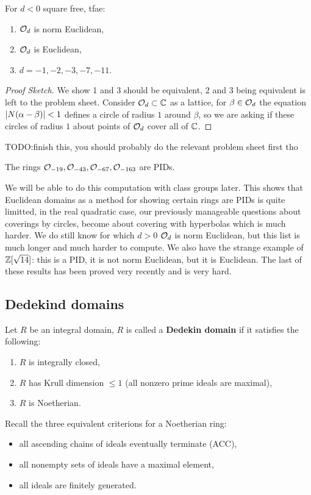\documentclass{article}
\begin{document}
\begin{theorem}
    For $d<0$ square free, tfae: \begin{enumerate}
        \item $\mathcal{O}_d$ is norm Euclidean,
        \item $\mathcal{O}_d$ is Euclidean,
        \item $d=-1,-2,-3,-7,-11$.
    \end{enumerate}
    \begin{proof}[Proof Sketch]
        We show 1 and 3 should be equivalent, 2 and 3 being equivalent is left to the problem sheet. Consider $\mathcal{O}_{d}\subset \mathbb{C}$ as a lattice, for $\beta\in\mathcal{O}_d$ the equation $\left| N(\alpha-\beta) \right|<1$ defines a circle of radius $1$ around $\beta$, so we are asking if these circles of radius $1$ about points of $\mathcal{O}_d$ cover all of $\mathbb{C}$. 
    \end{proof}
\end{theorem}

TODO:finish this, you should probably do the relevant problem sheet first tho

\begin{theorem}
    The rings $\mathcal{O}_{-19},\mathcal{O}_{-43},\mathcal{O}_{-67},\mathcal{O}_{-163}$ are PIDs.
\end{theorem}

We will be able to do this computation with class groups later. This shows that Euclidean domains as a method for showing certain rings are PIDs is quite limitted, in the real quadratic case, our previously manageable questions about coverings by circles, become about covering with hyperbolas which is much harder. We do still know for which $d>0$ $\mathcal{O}_d$ is norm Euclidean, but this list is much longer and much harder to compute. We also have the strange example of $\mathbb{Z}[\sqrt{14}]$: this is a PID, it is not norm Euclidean, but it is Euclidean. The last of these results has been proved very recently and is very hard.

\subsection{Dedekind domains}

\begin{definition}
    Let $R$ be an integral domain, $R$ is called a \textbf{Dedekin domain} if it satisfies the following: \begin{enumerate}
        \item $R$ is integrally closed,
        \item $R$ has Krull dimension $\leq 1$ (all nonzero prime ideals are maximal),
        \item $R$ is Noetherian.
    \end{enumerate}
\end{definition}
\noindent Recall the three equivalent criterions for a Noetherian ring: \begin{itemize}
    \item all ascending chains of ideals eventually terminate (ACC),
    \item all nonempty sets of ideals have a maximal element,
    \item all ideals are finitely generated.
\end{itemize}
\end{document}
